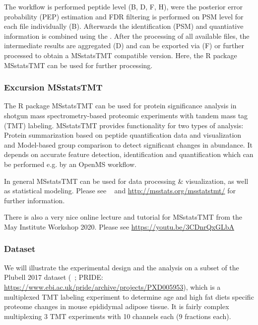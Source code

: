 The workflow is performed peptide level (B, D, F, H), were the posterior error probability (PEP) estimation and FDR filtering is performed on PSM level for each file individually (B). Afterwards the identification (PSM) and quantiative information is combined using the . After the processing of all available files, the intermediate results are aggregated (D) and can be exported via  (F) or further processed to obtain a MSstatsTMT
compatible version. Here, the R package MSstatsTMT can be used for further processing. \\

\subsubsection{Excursion MSstatsTMT}
The R package MSstatsTMT can be used for protein significance analysis in shotgun mass spectrometry-based proteomic experiments with tandem mass tag (TMT) labeling. MSstatsTMT provides functionality for two types of analysis: Protein summarization based on peptide quantification data and visualization and Model-based group comparison to detect significant changes in abundance. It depends on accurate feature detection, identification and quantification which can be performed e.g. by an OpenMS workflow. 

\noindent In general MSstatsTMT can be used for data processing \& visualization, as well as statistical modeling. Please see ~\cite{Huang2020} and \url{http://msstats.org/msstatstmt/} for further information.

\noindent There is also a very nice online lecture and tutorial for MSstatsTMT from the May Institute Workshop 2020. Please see \url{https://youtu.be/3CDnrQxGLbA}

\subsubsection{Dataset}
We will illustrate the experimental design and the analysis on a subset of the Plubell 2017 dataset (~\cite{Plubell2017}; PRIDE: \url{https://www.ebi.ac.uk/pride/archive/projects/PXD005953}), which is a multiplexed TMT labeling experiment to determine age and high fat diets specific proteome changes in mouse epididymal adipose tissue. It is fairly complex multiplexing 3 TMT experiments with 10 channels each (9 fractions each). 

